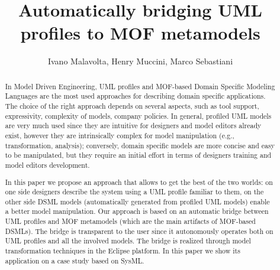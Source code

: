 \documentclass[orivec]{llncs}
\begin{document}
\title{{Automatically bridging UML profiles to MOF metamodels}
}


\author{Ivano Malavolta, Henry Muccini, Marco Sebastiani}

\maketitle

\begin{abstract}
In Model Driven Engineering, UML profiles and MOF-based Domain Specific Modeling Languages are the most used approaches for describing domain specific applications.
The choice of the right approach depends on several aspects, such as tool support, expressivity, complexity of models, company policies. In general, profiled UML models are very much used since they are intuitive for designers and model editors already exist, however they are intrinsically complex for model manipulation (e.g., transformation, analysis); conversely, domain specific models are more concise and easy to be manipulated, but they require an initial effort in terms of designers training and model editors development.

In this paper we propose an approach that allows to get the best of the two worlds:
on one side designers describe the system using a UML profile familiar to them, on the other side DSML models (automatically generated from profiled UML models) enable a better model manipulation. Our approach is based on an automatic bridge between UML profiles and MOF metamodels (which are the main artifacts of MOF-based DSMLs). The bridge is transparent to the user since it autonomously operates both on UML profiles
and all the involved models. The bridge is realized through model transformation techniques in the Eclipse platform. In this paper we show its application on a case study based on SysML.



\end{abstract}
\end{document}
